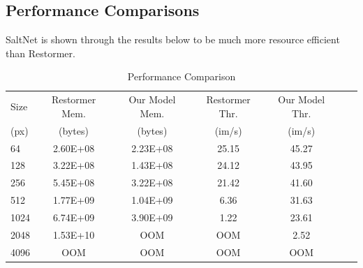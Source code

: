 \pagebreak

\subsection{Performance Comparisons}

SaltNet is shown through the results below to be much more resource efficient than Restormer.

\begin{table}[!hbt]
    \centering
    \caption{Performance Comparison}
    \begin{tabular}{lcccccc}
    \toprule
    Size & Restormer Mem. & Our Model Mem. & Restormer Thr. & Our Model Thr. \\
    (px) & (bytes) & (bytes) & (im/s) & (im/s) \\
    \midrule
    64 & 2.60E+08 & 2.23E+08 & 25.15 & 45.27 \\
    128 & 3.22E+08 & 1.43E+08 & 24.12 & 43.95 \\
    256 & 5.45E+08 & 3.22E+08 & 21.42 & 41.60 \\
    512 & 1.77E+09 & 1.04E+09 & 6.36 & 31.63 \\
    1024 & 6.74E+09 & 3.90E+09 & 1.22 & 23.61 \\
    2048 & 1.53E+10 & OOM & OOM & 2.52 \\
    4096 & OOM & OOM & OOM & OOM \\
    \bottomrule
    \end{tabular}
\end{table}

